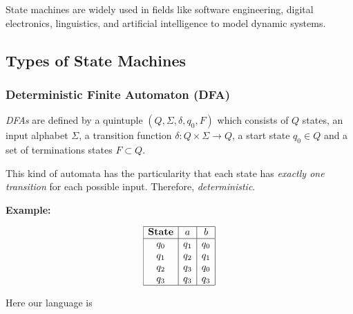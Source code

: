 State machines are widely used in fields like software engineering, digital electronics, linguistics, 
and artificial intelligence to model dynamic systems.

\subsection{Types of State Machines}

\subsubsection{Deterministic Finite Automaton (DFA)}  

\emph{DFAs} are defined by a quintuple \((Q, \Sigma, \delta, q_0, F)\) which consists of \(Q\) states, 
an input alphabet \(\Sigma\), a transition function \(\delta: Q \times \Sigma \to Q\), a start state \(q_0 \in Q\) and a set of 
terminations states \(F \subset Q\).

This kind of automata has the particularity that each state has \emph{exactly one transition} for 
each possible input. Therefore, \emph{deterministic}.

\textbf{Example:}

\[
    \begin{array}{|c|c|c|}
    \hline
    \textbf{State} & a & b \\
    \hline
    q_0 & q_1 & q_0 \\
    q_1 & q_2 & q_1 \\
    q_2 & q_3 & q_0 \\
    q_3 & q_3 & q_3 \\
    \hline
    \end{array}
\]
\begin{center}
\end{center}

Here our language is 

